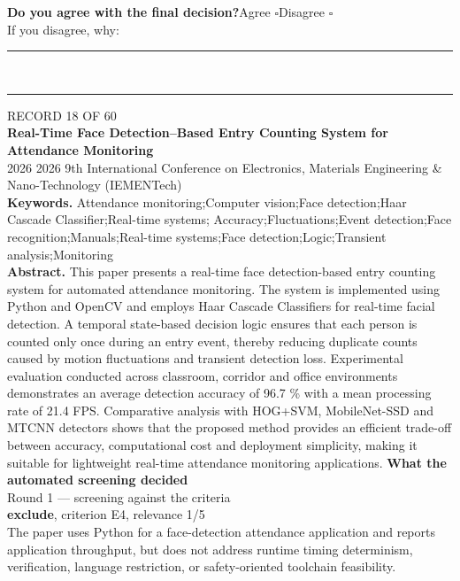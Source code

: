 \documentclass[11pt,a4paper]{article}
\begin{document}
{\small\textbf{Do you agree with the final decision?}\quad{}Agree $\square$\qquad{}Disagree $\square$}\\[1mm]
{\footnotesize\color{soft}If you disagree, why:}\\[1mm]
\color{rule}\rule{\linewidth}{0.3pt}\\[3mm]\rule{\linewidth}{0.3pt}\color{black}
\clearpage
{\color{soft}\footnotesize RECORD 18 OF 60}\\[1mm]
{\large\bfseries Real-Time Face Detection--Based Entry Counting System for Attendance Monitoring}\\[1.5mm]
{\color{soft}\small 2026 \textperiodcentered{} 2026 9th International Conference on Electronics, Materials Engineering \& Nano-Technology (IEMENTech)}\\[2mm]
{\small\textbf{Keywords.} Attendance monitoring;Computer vision;Face detection;Haar Cascade Classifier;Real-time systems; Accuracy;Fluctuations;Event detection;Face recognition;Manuals;Real-time systems;Face detection;Logic;Transient analysis;Monitoring}\\[2mm]
{\small\textbf{Abstract.} This paper presents a real-time face detection-based entry counting system for automated attendance monitoring. The system is implemented using Python and OpenCV and employs Haar Cascade Classifiers for real-time facial detection. A temporal state-based decision logic ensures that each person is counted only once during an entry event, thereby reducing duplicate counts caused by motion fluctuations and transient detection loss. Experimental evaluation conducted across classroom, corridor and office environments demonstrates an average detection accuracy of 96.7 \% with a mean processing rate of 21.4 FPS. Comparative analysis with HOG+SVM, MobileNet-SSD and MTCNN detectors shows that the proposed method provides an efficient trade-off between accuracy, computational cost and deployment simplicity, making it suitable for lightweight real-time attendance monitoring applications.}
\vspace{3mm}
\vspace{2.5mm}
{\small\textbf{What the automated screening decided}}\\[2mm]
{\footnotesize\color{soft}Round 1 --- screening against the criteria}\\[0.5mm]
{\small\textbf{exclude}, criterion E4, relevance 1/5}\\[0.5mm]
{\small The paper uses Python for a face-detection attendance application and reports application throughput, but does not address runtime timing determinism, verification, language restriction, or safety-oriented toolchain feasibility.}\\[2.5mm]
\end{document}
